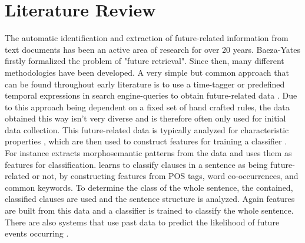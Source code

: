 \documentclass[a4paper,10pt]{report} %
\begin{document}




\chapter{Literature Review}
The automatic identification and extraction of future-related information from text documents has been an active area of research for over 20 years. Baeza-Yates \cite{BaezaYatesSearchingTF} firstly formalized the problem of "future retrieval". Since then, many different methodologies have been developed. A very simple but common approach that can be found throughout early literature is to use a time-tagger or predefined temporal expressions in search engine-queries to obtain future-related data \cite{chronoseeker, supportingAnalysis, analyzingCollective, rankingRelated, extractingCollective}. Due to this approach being dependent on a fixed set of hand crafted rules, the data obtained this way isn't very diverse and is therefore often only used for initial data collection. This future-related data is typically analyzed for characteristic properties \cite{improvingRetrieval}, which are then used to construct features for training a classifier \cite{computationalExploration}. For instance \cite{automaticExtraction} extracts morphosemantic patterns from the data and uses them as features for classification. \cite{extractingPredictive} learns to classify clauses in a sentence as being future-related or not, by constructing features from POS tags, word co-occurrences, and common keywords. To determine the class of the whole sentence, the contained, classified clauses are used and the sentence structure is analyzed. Again features are built from this data and a classifier is trained to classify the whole sentence. There are also systems that use past data to predict the likelihood of future events occurring \cite{miningTheWeb, predictingTheNews}.
\end{document}
